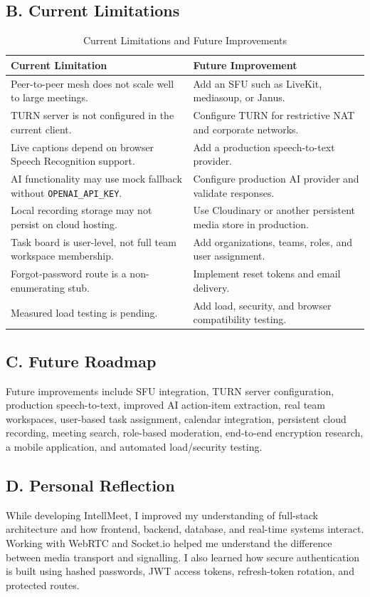 \documentclass[11pt,a4paper]{article}
\begin{document}
\subsection{B. Current Limitations}
\begin{table}[H]
\centering
\small
{}
\begin{tabularx}{\linewidth}{Y Y}
\toprule
\textbf{Current Limitation} & \textbf{Future Improvement}\\
\midrule
Peer-to-peer mesh does not scale well to large meetings. & Add an SFU such as LiveKit, mediasoup, or Janus.\\
TURN server is not configured in the current client. & Configure TURN for restrictive NAT and corporate networks.\\
Live captions depend on browser Speech Recognition support. & Add a production speech-to-text provider.\\
AI functionality may use mock fallback without \texttt{OPENAI\_API\_KEY}. & Configure production AI provider and validate responses.\\
Local recording storage may not persist on cloud hosting. & Use Cloudinary or another persistent media store in production.\\
Task board is user-level, not full team workspace membership. & Add organizations, teams, roles, and user assignment.\\
Forgot-password route is a non-enumerating stub. & Implement reset tokens and email delivery.\\
Measured load testing is pending. & Add load, security, and browser compatibility testing.\\
\bottomrule
\end{tabularx}
\caption{Current Limitations and Future Improvements}
\label{tab:limitations}
\end{table}

\subsection{C. Future Roadmap}
Future improvements include SFU integration, TURN server configuration, production speech-to-text, improved AI action-item extraction, real team workspaces, user-based task assignment, calendar integration, persistent cloud recording, meeting search, role-based moderation, end-to-end encryption research, a mobile application, and automated load/security testing.

\subsection{D. Personal Reflection}
While developing IntellMeet, I improved my understanding of full-stack architecture and how frontend, backend, database, and real-time systems interact. Working with WebRTC and Socket.io helped me understand the difference between media transport and signalling. I also learned how secure authentication is built using hashed passwords, JWT access tokens, refresh-token rotation, and protected routes.
\end{document}

